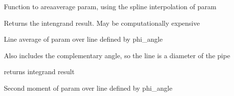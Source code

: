 \documentclass[letterpaper,10pt,english]{sphinxmanual}
\begin{document}
\begin{fulllineitems}
\begin{fulllineitems}
\end{fulllineitems}


\begin{fulllineitems}
\label{\detokenize{api/MARIGOLD.Condition:MARIGOLD.Condition.interp_area_avg}}
\pysigstartsignatures
{}
\pysigstopsignatures
\sphinxAtStartPar
Function to area\sphinxhyphen{}average param, using the spline interpolation of param

\sphinxAtStartPar
Returns the intengrand result. May be computationally expensive

\end{fulllineitems}


\begin{fulllineitems}
\label{\detokenize{api/MARIGOLD.Condition:MARIGOLD.Condition.line_avg}}
\pysigstartsignatures
{}
\pysigstopsignatures
\sphinxAtStartPar
Line average of param over line defined by phi\_angle

\sphinxAtStartPar
Also includes the complementary angle, so the line is a diameter of the pipe

\sphinxAtStartPar
returns integrand result

\end{fulllineitems}


\begin{fulllineitems}
\label{\detokenize{api/MARIGOLD.Condition:MARIGOLD.Condition.line_avg_dev}}
\pysigstartsignatures
{}
\pysigstopsignatures
\sphinxAtStartPar
Second moment of param over line defined by phi\_angle


\end{fulllineitems}
\end{fulllineitems}
\end{document}
